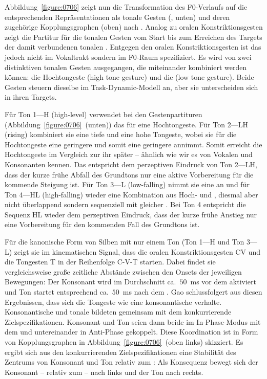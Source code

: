 Abbildung~\ref{figure:0706} zeigt nun die Transformation des F0-Verlaufs auf die entsprechenden Repräsentationen als tonale Gesten (, unten) und deren zugehörige Kopplungsgraphen (oben) nach \citet{Gao2009}. Analog zu oralen Konstriktionsgesten zeigt die Partitur für die tonalen Gesten  vom Start bis zum Erreichen des Targets der damit verbundenen tonalen . Entgegen den oralen Konstriktionsgesten ist das  jedoch nicht im Vokaltrakt sondern im F0-Raum spezifiziert. Es wird von zwei distinktiven tonalen Gesten ausgegangen, die miteinander kombiniert werden können: die Hochtongeste (high tone gesture) und die  (low tone gesture). Beide Gesten steuern dieselbe  im Task-Dynamic-Modell an, aber sie unterscheiden sich in ihren Targets.


Für Ton 1---H  (high-level) verwendet \citet{Gao2009} bei den Gestenpartituren (Abbildung~\ref{figure:0706}~(unten)) das  für eine Hochtongeste. Für Ton 2---LH (rising) kombiniert sie eine tiefe und eine hohe Tongeste, wobei sie für die Hochtongeste eine geringere  und somit eine geringere  annimmt. Somit erreicht die Hochtongeste im Vergleich zur  ihr  später -- ähnlich wie wir es von Vokalen und Konsonanten kennen. Das entspricht dem perzeptiven Eindruck von Ton 2---LH, dass der kurze frühe Abfall des Grundtons nur eine aktive Vorbereitung für die kommende Steigung ist. Für Ton 3---L (low-falling) nimmt sie eine  an und für Ton 4---HL (high-falling) wieder eine Kombination aus Hoch- und , diesmal aber nicht überlappend sondern sequenziell mit gleicher . Bei Ton 4 entspricht die Sequenz HL wieder dem perzeptiven Eindruck, dass der kurze frühe Anstieg nur eine Vorbereitung für den kommenden Fall des Grundtons ist.

Für die kanonische Form von Silben mit nur einem Ton (Ton 1---H und Ton 3---L) zeigt sie im kinematischen Signal, dass die oralen Konstriktionsgesten CV und die Tongesten T in der Reihenfolge C-V-T starten. Dabei findet sie vergleichsweise große zeitliche Abstände zwischen den Onsets der jeweiligen Bewegungen: Der Konsonant wird im Durchschnitt ca.~$50$~ms vor dem  aktiviert und Ton startet entsprechend ca.~$50$~ms nach dem . Gao schlussfolgert aus diesen Ergebnissen, dass sich die Tongeste wie eine konsonantische  verhalte. Konsonantische und tonale  bildeten gemeinsam mit dem  konkurrierende Zielspezifikationen. Konsonant und Ton seien dann beide im In-Phase-Modus mit dem  und untereinander in Anti-Phase gekoppelt. Diese Koordination ist in Form von Kopplungsgraphen in Abbildung~\ref{figure:0706}~(oben links) skizziert. Es ergibt sich aus den konkurrierenden Zielspezifikationen eine Stabilität des Zentrums von Konsonant und Ton relativ zum : Als Konsequenz bewegt sich der Konsonant -- relativ zum  -- nach links und der Ton nach rechts.


